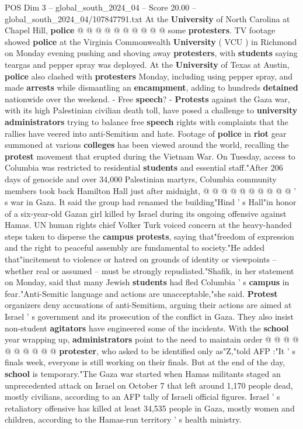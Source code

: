 \begin{textsample}{POS Dim 3 – global\_south\_2024\_04 – Score 20.00 – global\_south\_2024\_04/107847791.txt}
At the \textbf{University} of North Carolina at Chapel Hill, \textbf{police} @ @ @ @ @ @ @ @ @ @ some \textbf{protesters}.
TV footage showed \textbf{police} at the Virginia Commonwealth \textbf{University} ( VCU ) in Richmond on Monday evening pushing and shoving away \textbf{protesters}, with \textbf{students} saying teargas and pepper spray was deployed.
At the \textbf{University} of Texas at Austin, \textbf{police} also clashed with \textbf{protesters} Monday, including using pepper spray, and made \textbf{arrests} while dismantling an \textbf{encampment}, adding to hundreds \textbf{detained} nationwide over the weekend. - Free \textbf{speech}? - \textbf{Protests} against the Gaza war, with its high Palestinian civilian death toll, have posed a challenge to \textbf{university} \textbf{administrators} trying to balance free \textbf{speech} rights with complaints that the rallies have veered into anti-Semitism and hate.
Footage of \textbf{police} in \textbf{riot} gear summoned at various \textbf{colleges} has been viewed around the world, recalling the \textbf{protest} movement that erupted during the Vietnam War.
On Tuesday, access to Columbia was restricted to residential \textbf{students} and essential staff."After 206 days of genocide and over 34,000 Palestinian martyrs, Columbia community members took back Hamilton Hall just after midnight, @ @ @ @ @ @ @ @ @ @ ' s war in Gaza.
It said the group had renamed the building"Hind ' s Hall"in honor of a six-year-old Gazan girl killed by Israel during its ongoing offensive against Hamas.
UN human rights chief Volker Turk voiced concern at the heavy-handed steps taken to disperse the \textbf{campus} \textbf{protests}, saying that"freedom of expression and the right to peaceful assembly are fundamental to society."He added that"incitement to violence or hatred on grounds of identity or viewpoints -- whether real or assumed -- must be strongly repudiated."Shafik, in her statement on Monday, said that many Jewish \textbf{students} had fled Columbia ' s \textbf{campus} in fear."Anti-Semitic language and actions are unacceptable,"she said. \textbf{Protest} organizers deny accusations of anti-Semitism, arguing their actions are aimed at Israel ' s government and its prosecution of the conflict in Gaza.
They also insist non-student \textbf{agitators} have engineered some of the incidents.
With the \textbf{school} year wrapping up, \textbf{administrators} point to the need to maintain order @ @ @ @ @ @ @ @ @ @ \textbf{protester}, who asked to be identified only as"Z,"told AFP :"It ' s finals week, everyone is still working on their finals.
But at the end of the day, \textbf{school} is temporary."The Gaza war started when Hamas militants staged an unprecedented attack on Israel on October 7 that left around 1,170 people dead, mostly civilians, according to an AFP tally of Israeli official figures.
Israel ' s retaliatory offensive has killed at least 34,535 people in Gaza, mostly women and children, according to the Hamas-run territory ' s health ministry.


\end{textsample}
